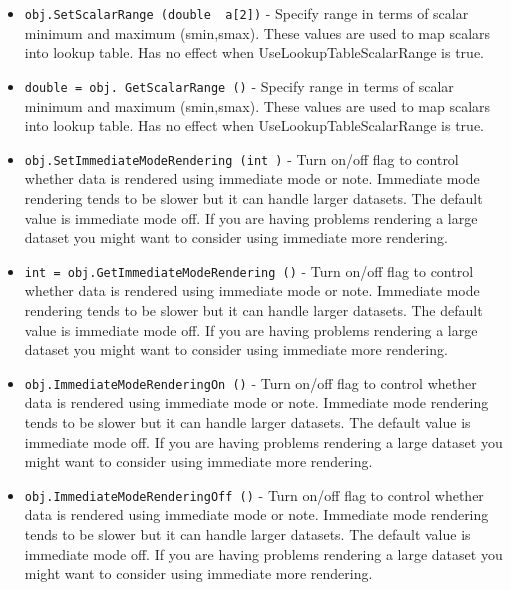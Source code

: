 \begin{itemize}
\item  \verb|obj.SetScalarRange (double  a[2])| -  Specify range in terms of scalar minimum and maximum (smin,smax). These
 values are used to map scalars into lookup table. Has no effect when
 UseLookupTableScalarRange is true.

\item  \verb|double = obj. GetScalarRange ()| -  Specify range in terms of scalar minimum and maximum (smin,smax). These
 values are used to map scalars into lookup table. Has no effect when
 UseLookupTableScalarRange is true.

\item  \verb|obj.SetImmediateModeRendering (int )| -  Turn on/off flag to control whether data is rendered using
 immediate mode or note. Immediate mode rendering
 tends to be slower but it can handle larger datasets.
 The default value is immediate mode off. If you are
 having problems rendering a large dataset you might
 want to consider using immediate more rendering.

\item  \verb|int = obj.GetImmediateModeRendering ()| -  Turn on/off flag to control whether data is rendered using
 immediate mode or note. Immediate mode rendering
 tends to be slower but it can handle larger datasets.
 The default value is immediate mode off. If you are
 having problems rendering a large dataset you might
 want to consider using immediate more rendering.

\item  \verb|obj.ImmediateModeRenderingOn ()| -  Turn on/off flag to control whether data is rendered using
 immediate mode or note. Immediate mode rendering
 tends to be slower but it can handle larger datasets.
 The default value is immediate mode off. If you are
 having problems rendering a large dataset you might
 want to consider using immediate more rendering.

\item  \verb|obj.ImmediateModeRenderingOff ()| -  Turn on/off flag to control whether data is rendered using
 immediate mode or note. Immediate mode rendering
 tends to be slower but it can handle larger datasets.
 The default value is immediate mode off. If you are
 having problems rendering a large dataset you might
 want to consider using immediate more rendering.


\end{itemize}

